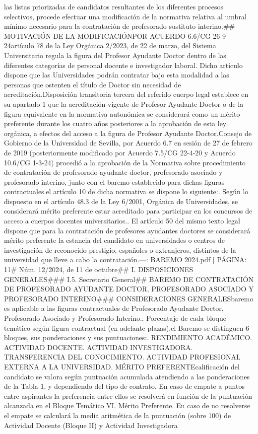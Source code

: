 \documentclass{article}
\begin{document}
\begin{itemize}
{{las listas priorizadas de candidatos resultantes de los diferentes procesos selectivos, procede efectuar una modificación de la normativa relativa al umbral mínimo necesario para la contratación de profesorado sustituto interino.\n\n## MOTIVACIÓN DE LA MODIFICACIÓN\n\nAPROBADA POR ACUERDO 6.6/CG 26-9-24\n\nEl artículo 78 de la Ley Orgánica 2/2023, de 22 de marzo, del Sistema Universitario regula la figura del Profesor Ayudante Doctor dentro de las diferentes categorías de personal docente e investigador laboral. Dicho artículo dispone que las Universidades podrán contratar bajo esta modalidad a las personas que ostenten el título de Doctor sin necesidad de acreditación.\n\nLa Disposición transitoria tercera del referido cuerpo legal establece en su apartado 1 que la acreditación vigente de Profesor Ayudante Doctor o de la figura equivalente en la normativa autonómica se considerará como un mérito preferente durante los cuatro años posteriores a la aprobación de esta ley orgánica, a efectos del acceso a la figura de Profesor Ayudante Doctor.\n\nEl Consejo de Gobierno de la Universidad de Sevilla, por Acuerdo 6.7 en sesión de 27 de febrero de 2019 (posteriormente modificado por Acuerdo 7.5/CG 22-4-20 y Acuerdo 10.6/CG 1-3-24) procedió a la aprobación de la Normativa sobre procedimiento de contratación de profesorado ayudante doctor, profesorado asociado y profesorado interino, junto con el baremo establecido para dichas figuras contractuales.\n\nEn el artículo 10 de dicha normativa se dispone lo siguiente:\n{}. Según lo dispuesto en el artículo 48.3 de la Ley 6/2001, Orgánica de Universidades, se considerará mérito preferente estar acreditado para participar en los concursos de acceso a cuerpos docentes universitarios.. El artículo 50 del mismo texto legal dispone que para la contratación de profesores ayudantes doctores se considerará mérito preferente la estancia del candidato en universidades o centros de investigación de reconocido prestigio, españoles o extranjeros, distintos de la universidad que lleve a cabo la contratación.\n\n---\n\nFUENTE: BAREMO 2024.pdf | PÁGINA: 11\n# Núm. 12/2024, de 11 de octubre\n\n## I. DISPOSICIONES GENERALES\n\n### I.5. Secretario General\n\n## BAREMO DE CONTRATACIÓN DE PROFESORADO AYUDANTE DOCTOR, PROFESORADO ASOCIADO Y PROFESORADO INTERINO\n\n### CONSIDERACIONES GENERALES\nEl baremo es aplicable a las figuras contractuales de Profesorado Ayudante Doctor, Profesorado Asociado y Profesorado Interino.\n{}. Porcentaje de cada bloque temático según figura contractual (en adelante plazas).\nEn el Baremo se distinguen 6 bloques, sus ponderaciones y sus puntuaciones:. RENDIMIENTO ACADÉMICO. ACTIVIDAD DOCENTE. ACTIVIDAD INVESTIGADORA. TRANSFERENCIA DEL CONOCIMIENTO. ACTIVIDAD PROFESIONAL EXTERNA A LA UNIVERSIDAD. MÉRITO PREFERENTE\n\nLa calificación del candidato se valora según puntuación acumulada atendiendo a las ponderaciones de la Tabla 1, y dependiendo del tipo de contrato. En caso de empate a puntos entre aspirantes la preferencia entre ellos se resolverá en función de la puntuación alcanzada en el Bloque Temático VI. Mérito Preferente. En caso de no resolverse el empate se calculará la media aritmética de la puntuación (sobre 100) de Actividad Docente (Bloque II) y Actividad Investigadora }}
\end{itemize}
\end{document}
